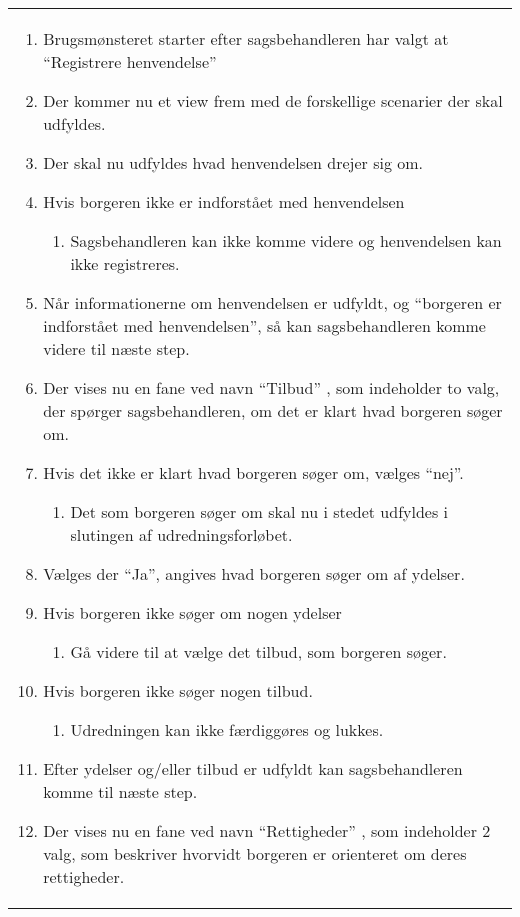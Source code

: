 \documentclass[../../main.tex]{subfiles}
\begin{document}
\begin{center}
\begin{longtable}{| p{}|}
\begin{adjustwidth}{1cm}{}
    \begin{enumerate}
    \item Brugsmønsteret starter efter sagsbehandleren har valgt at “Registrere henvendelse”
    \item Der kommer nu et view frem med de forskellige scenarier der skal udfyldes. 
    \item Der skal nu udfyldes hvad henvendelsen drejer sig om. 
    \item Hvis borgeren ikke er indforstået med henvendelsen
    \begin{enumerate}[label=\Alph*]
    	\item Sagsbehandleren kan ikke komme videre og henvendelsen kan ikke registreres.
    \end{enumerate}
    \item Når informationerne om henvendelsen er udfyldt, og “borgeren er indforstået med henvendelsen”, så kan sagsbehandleren komme videre til næste step.
    \item Der vises nu en fane ved navn “Tilbud” , som indeholder to valg, der spørger sagsbehandleren, om det er klart hvad borgeren søger om.
    \item Hvis det ikke er klart hvad borgeren søger om, vælges “nej”.
    \begin{enumerate}[label=\Alph*]
    \item Det som borgeren søger om skal nu i stedet udfyldes i slutingen af udredningsforløbet.
    \end{enumerate}
    \item Vælges der “Ja”, angives hvad borgeren søger om af ydelser.
    \item Hvis borgeren ikke søger om nogen ydelser
    \begin{enumerate}[label=\Alph*]
    \item Gå videre til at vælge det tilbud, som borgeren søger.
    \end{enumerate}
    \item Hvis borgeren ikke søger nogen tilbud. 
    \begin{enumerate}[label=\Alph*]
    \item Udredningen kan ikke færdiggøres og lukkes.
    \end{enumerate}
    \item Efter ydelser og/eller tilbud er udfyldt kan sagsbehandleren komme til næste step.
    \item Der vises nu en fane ved navn “Rettigheder” , som indeholder 2 valg, som beskriver hvorvidt borgeren er orienteret om deres rettigheder.

\end{enumerate}
\end{adjustwidth}
\end{longtable}
\end{center}
\end{document}
